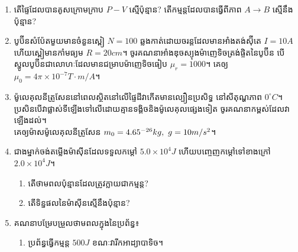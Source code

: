 \documentclass{officialexam}
\begin{document}
\begin{enumerate}[I]
	\item តើផ្ទៃដែលបានគូសក្រោមក្រាប $P-V$ ស្មើប៉ុន្មាន? តើកម្មន្តដែលបានធ្វើពីភាព $A\rightarrow B$ ស្មើនឹងប៉ុន្មាន?
	\begin{center}
	\end{center}
	\item បូប៊ីនសំប៉ែតមួយមានចំនួនស្ពៀ $N=100$ ឆ្លងកាត់ដោយចរន្តដែលមានអាំងតង់ស៊ុីតេ $I=10A$ ហើយស្ពៀមានកាំមធ្យម $R=20cm$។ ចូរគណនាអាំងឌុចស្យុងម៉ាញេទិចត្រង់ផ្ចិតនៃបូប៊ីន បើស្នូលបូប៊ីនជាលោហៈដែលមានជម្រាបម៉ាញេទិចធៀប $\mu_r=1000$។ គេឲ្យ $\mu_0=4\pi \times10^{-7}T\cdot m/A$។
	\item ម៉ូលេគុលនីត្រូសែននៅពេលស្ថិតនៅលើផ្ទៃដីវាកើតមានល្បឿនប្រសិទ្ធ នៅសីតុណ្ហភាព $0^\circ C$។ ប្រសិនបើវាផ្លាស់ទីឡើងទៅលើដោយគ្មានទង្គិចនិងម៉ូលេគុលផ្សេងទៀត ចូរគណនាកម្ពស់ដែលវាឡើងដល់។\\ គេឲ្យម៉ាសម៉ូលេគុលនីត្រូសែន $m_0=4.65\time10^{-26}kg,~g=10m/s^2$។
	\item ជាងម្នាក់ចង់តម្លើងម៉ាសុីនដែលទទួលកម្តៅ $5.0\times10^{4}J$ ហើយបញ្ចេញកម្តៅទៅខាងក្រៅ $2.0\times10^{4}J$។
	\begin{enumerate}[k,2]
		\item តើថាមពលប៉ុន្មានដែលត្រូវក្លាយជាកម្មន្ត?
		\item តើទិន្នផលនៃម៉ាសុីនស្មើនឹងប៉ុន្មាន?
	\end{enumerate}
	\item គណនាបម្រែបម្រួលថាមពលក្នុងនៃប្រព័ន្ធ៖
	\begin{enumerate}[k]
		\item ប្រព័ន្ធធ្វើកម្មន្ត $500J$ ខណៈវារីកអាដ្យាបាទិច។

\end{enumerate}
\end{enumerate}
\end{document}
